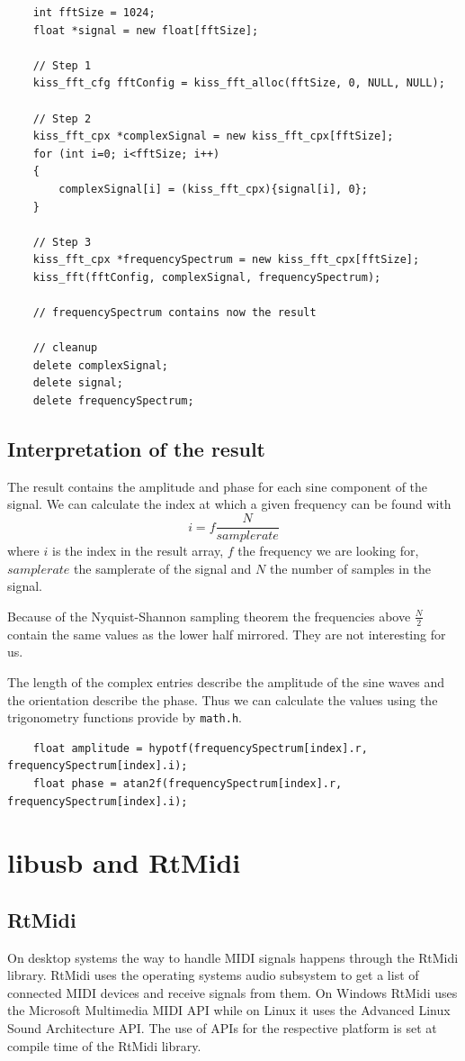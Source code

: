 \begin{lstlisting}
	int fftSize = 1024;
	float *signal = new float[fftSize];

	// Step 1
	kiss_fft_cfg fftConfig = kiss_fft_alloc(fftSize, 0, NULL, NULL);
	
	// Step 2
	kiss_fft_cpx *complexSignal = new kiss_fft_cpx[fftSize];
	for (int i=0; i<fftSize; i++)
	{
		complexSignal[i] = (kiss_fft_cpx){signal[i], 0};
	}
	
	// Step 3
	kiss_fft_cpx *frequencySpectrum = new kiss_fft_cpx[fftSize];
	kiss_fft(fftConfig, complexSignal, frequencySpectrum);
	
	// frequencySpectrum contains now the result
	
	// cleanup
	delete complexSignal;
	delete signal;
	delete frequencySpectrum;
\end{lstlisting}

\subsection{Interpretation of the result}
The result contains the amplitude and phase for each sine component of the signal. We can calculate the index at which a given frequency can be found with
$$ i = f \frac{N}{samplerate} $$
where $i$ is the index in the result array, $f$ the frequency we are looking for, $samplerate$ the samplerate of the signal and $N$ the number of samples in the signal.

Because of the Nyquist-Shannon sampling theorem the frequencies above $\frac{N}{2}$ contain the same values as the lower half mirrored. They are not interesting for us.

The length of the complex entries describe the amplitude of the sine waves and the orientation describe the phase. Thus we can calculate the values using the trigonometry functions provide by {\tt math.h}.
\begin{lstlisting}
	float amplitude = hypotf(frequencySpectrum[index].r, frequencySpectrum[index].i);
	float phase = atan2f(frequencySpectrum[index].r, frequencySpectrum[index].i);
\end{lstlisting}


\section[libusb and RtMidi \textsuperscript{Neumayer}]{libusb and RtMidi}
\label{sec:libusb and RtMidi}

\subsection{RtMidi}
On desktop systems the way to handle MIDI signals happens through the RtMidi library. 
RtMidi uses the operating systems audio subsystem to get a list of connected MIDI devices and receive signals from them. On Windows RtMidi uses the Microsoft Multimedia MIDI API while on Linux it uses the Advanced Linux Sound Architecture API. The use of APIs for the respective platform is set at compile time of the RtMidi library.

